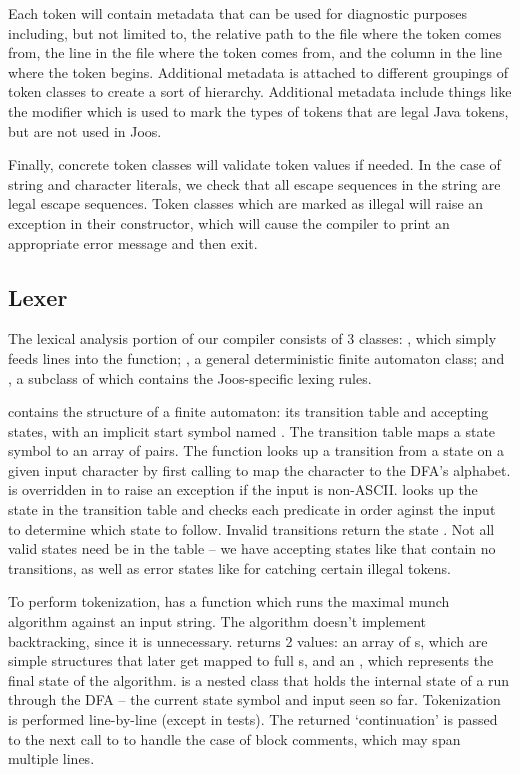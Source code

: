 \documentclass[pdftex,11pt,a4paper]{article}
\begin{document}
Each token will contain metadata that can be used for diagnostic
purposes including, but not limited to, the relative path to the file
where the token comes from, the line in the file where the token comes
from, and the column in the line where the token begins. Additional
metadata is attached to different groupings of token classes to create
a sort of hierarchy. Additional metadata include things like the
 modifier which is used to mark the types of tokens
that are legal Java tokens, but are not used in Joos.

Finally, concrete token classes will validate token values if
needed. In the case of string and character literals, we check that
all escape sequences in the string are legal escape sequences. Token
classes which are marked as illegal will raise an exception in their
constructor, which will cause the compiler to print an appropriate
error message and then exit.


\subsection{Lexer}

The lexical analysis portion of our compiler consists of 3 classes: 
, which simply feeds lines into the 
function; , a general deterministic finite automaton class;
and , a subclass of  which contains the
Joos-specific lexing rules.

 contains the structure of a finite automaton: its
transition table and accepting states, with an implicit start symbol
named . The transition table maps a state symbol to an
array of  pairs. The  function
looks up a transition from a state on a given input character by
first calling  to map the character to the DFA's alphabet.
 is overridden in  to raise an exception
if the input is non-ASCII.  looks up the state in the
transition table and checks each predicate in order aginst the input
to determine which state to follow. Invalid transitions return the
state . Not all valid states need be in the table --
we have accepting states like  that contain
no transitions, as well as error states like  for
catching certain illegal tokens.

To perform tokenization,  has a function 
which runs the maximal munch algorithm against an input string. The
algorithm doesn't implement backtracking, since it is unnecessary.
 returns 2 values: an array of s, which
are simple structures that later get mapped to full s,
and an , which represents the final state of the
algorithm.  is a nested class that holds the internal
state of a run through the DFA -- the current state symbol and input seen so
far. Tokenization is performed line-by-line (except in tests). The
returned  `continuation' is passed to the next
call to  to handle the case of block comments, which may
span multiple lines.
\end{document}
